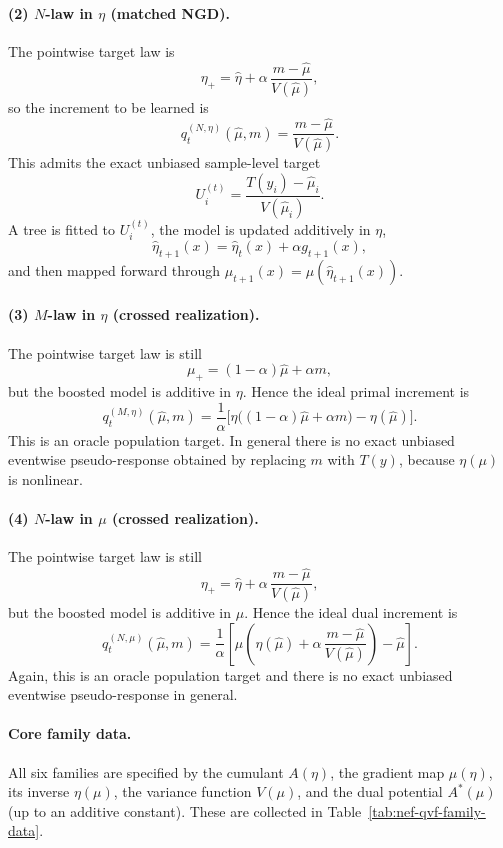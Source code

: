 \documentclass[11pt]{article}
\begin{document}
\paragraph{(2) \(N\)-law in \(\eta\) (matched NGD).}
The pointwise target law is
\[
\eta_{+}=\hat\eta+\alpha\,\frac{m-\hat\mu}{V(\hat\mu)},
\]
so the increment to be learned is
\[
q_t^{(N,\eta)}(\hat\mu,m)=\frac{m-\hat\mu}{V(\hat\mu)}.
\]
This admits the exact unbiased sample-level target
\[
U_i^{(t)}=\frac{T(y_i)-\hat\mu_i}{V(\hat\mu_i)}.
\]
A tree is fitted to \(U_i^{(t)}\), the model is updated additively in \(\eta\),
\[
\hat\eta_{t+1}(x)=\hat\eta_t(x)+\alpha g_{t+1}(x),
\]
and then mapped forward through \(\hat\mu_{t+1}(x)=\mu(\hat\eta_{t+1}(x))\).

\paragraph{(3) \(M\)-law in \(\eta\) (crossed realization).}
The pointwise target law is still
\[
\mu_{+}=(1-\alpha)\hat\mu+\alpha m,
\]
but the boosted model is additive in \(\eta\). Hence the ideal primal increment is
\[
q_t^{(M,\eta)}(\hat\mu,m)
=
\frac{1}{\alpha}\Big[\eta\big((1-\alpha)\hat\mu+\alpha m\big)-\eta(\hat\mu)\Big].
\]
This is an oracle population target. In general there is no exact unbiased eventwise pseudo-response obtained by replacing \(m\) with \(T(y)\), because \(\eta(\mu)\) is nonlinear.

\paragraph{(4) \(N\)-law in \(\mu\) (crossed realization).}
The pointwise target law is still
\[
\eta_{+}=\hat\eta+\alpha\,\frac{m-\hat\mu}{V(\hat\mu)},
\]
but the boosted model is additive in \(\mu\). Hence the ideal dual increment is
\[
q_t^{(N,\mu)}(\hat\mu,m)
=
\frac{1}{\alpha}
\left[
\mu\!\left(\eta(\hat\mu)+\alpha\,\frac{m-\hat\mu}{V(\hat\mu)}\right)-\hat\mu
\right].
\]
Again, this is an oracle population target and there is no exact unbiased eventwise pseudo-response in general.

\paragraph{Core family data.}
All six families are specified by the cumulant \(A(\eta)\), the gradient map \(\mu(\eta)\), its inverse \(\eta(\mu)\), the variance function \(V(\mu)\), and the dual potential \(A^\ast(\mu)\) (up to an additive constant). These are collected in Table~\ref{tab:nef-qvf-family-data}.
\end{document}
